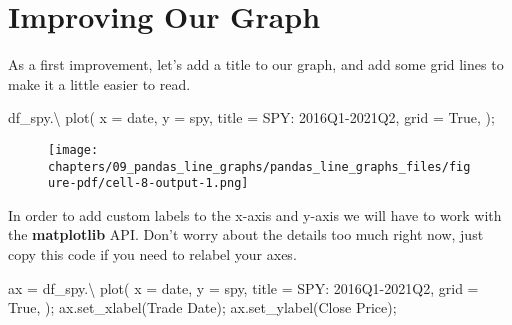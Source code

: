 \documentclass[
  letterpaper,
  DIV=11,
  numbers=noendperiod]{scrreprt}
\newenvironment{Shaded}{\begin{snugshade}}{\end{snugshade}}
\newcommand{\NormalTok}[1]{\textcolor[rgb]{0.00,0.23,0.31}{#1}}
\newcommand{\OperatorTok}[1]{\textcolor[rgb]{0.37,0.37,0.37}{#1}}
\newcommand{\StringTok}[1]{\textcolor[rgb]{0.13,0.47,0.30}{#1}}
\newcommand{\VariableTok}[1]{\textcolor[rgb]{0.07,0.07,0.07}{#1}}
\begin{document}
\hypertarget{improving-our-graph}{%
\section{Improving Our Graph}\label{improving-our-graph}}

As a first improvement, let's add a title to our graph, and add some
grid lines to make it a little easier to read.

\begin{Shaded}
\begin{Highlighting}[]
\NormalTok{df\_spy.}\OperatorTok{\textbackslash{}}
\NormalTok{    plot(}
\NormalTok{        x }\OperatorTok{=} \StringTok{\textquotesingle{}date\textquotesingle{}}\NormalTok{,}
\NormalTok{        y }\OperatorTok{=} \StringTok{\textquotesingle{}spy\textquotesingle{}}\NormalTok{,}
\NormalTok{        title }\OperatorTok{=} \StringTok{\textquotesingle{}SPY: 2016Q1{-}2021Q2\textquotesingle{}}\NormalTok{,}
\NormalTok{        grid }\OperatorTok{=} \VariableTok{True}\NormalTok{,}
\NormalTok{    )}\OperatorTok{;}
\end{Highlighting}
\end{Shaded}

\begin{figure}[H]

{\centering \texttt{[image: chapters/09\_pandas\_line\_graphs/pandas\_line\_graphs\_files/figure-pdf/cell-8-output-1.png]}

}

\end{figure}

In order to add custom labels to the x-axis and y-axis we will have to
work with the \textbf{matplotlib} API. Don't worry about the details too
much right now, just copy this code if you need to relabel your axes.

\begin{Shaded}
\begin{Highlighting}[]
\NormalTok{ax }\OperatorTok{=}\NormalTok{ df\_spy.}\OperatorTok{\textbackslash{}}
\NormalTok{        plot(}
\NormalTok{            x }\OperatorTok{=} \StringTok{\textquotesingle{}date\textquotesingle{}}\NormalTok{,}
\NormalTok{            y }\OperatorTok{=} \StringTok{\textquotesingle{}spy\textquotesingle{}}\NormalTok{,}
\NormalTok{            title }\OperatorTok{=} \StringTok{\textquotesingle{}SPY: 2016Q1{-}2021Q2\textquotesingle{}}\NormalTok{,}
\NormalTok{            grid }\OperatorTok{=} \VariableTok{True}\NormalTok{,}
\NormalTok{        )}\OperatorTok{;}
\NormalTok{ax.set\_xlabel(}\StringTok{\textquotesingle{}Trade Date\textquotesingle{}}\NormalTok{)}\OperatorTok{;}
\NormalTok{ax.set\_ylabel(}\StringTok{\textquotesingle{}Close Price\textquotesingle{}}\NormalTok{)}\OperatorTok{;}
\end{Highlighting}
\end{Shaded}
\end{document}
